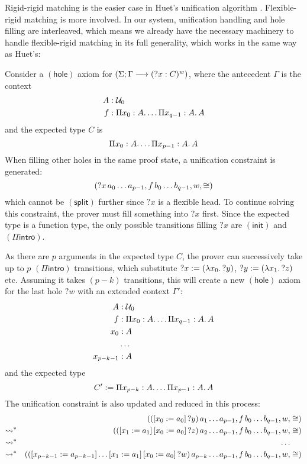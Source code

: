 \documentclass[twoside]{report}
\begin{document}
Rigid-rigid matching is the easier case in Huet's unification algorithm \cite{huet1975unification}. Flexible-rigid matching is more involved. In our system, unification handling and hole filling are interleaved, which means we already have the necessary machinery to handle flexible-rigid matching in its full generality, which works in the same way as Huet's:

\begin{example}
Consider a $(\mathsf{hole})$ axiom for $(\Sigma; \Gamma \longrightarrow ({?x} : C)^w)$, where the antecedent $\Gamma$ is the context
$$
\begin{aligned}
A &: \mathcal U_0 \\
f &: \Pi{x_0} : {A}.\,{\ldots \Pi{x_{q-1}} : {A}.\,{A}} \\
\end{aligned}
$$
and the expected type $C$ is
$$
\Pi{x_0} : {A}.\,{\ldots \Pi{x_{p-1}} : {A}.\,{A}}
$$
When filling other holes in the same proof state, a unification constraint is generated:
$$
({{{?x}\,{a_0}}\,{\ldots}}\,{a_{p-1}}, {{{f}\,{b_0}}\,{\ldots}}\,{b_{q-1}}, w, \cong)
$$
which cannot be $(\mathsf{split})$ further since ${?x}$ is a flexible head. To continue solving this constraint, the prover must fill something into ${?x}$ first. Since the expected type is a function type, the only possible transitions filling ${?x}$ are $(\mathsf{init})$ and $(\Pi\mathsf{intro})$.

As there are $p$ arguments in the expected type $C$, the prover can successively take up to $p$ $(\Pi\mathsf{intro})$ transitions, which substitute ${?x} := (\lambda{x_0}.\,{?y})$, ${?y} := (\lambda{x_1}.\,{?z})$ etc. Assuming it takes $(p - k)$ transitions, this will create a new $(\mathsf{hole})$ axiom for the last hole ${?w}$ with an extended context $\Gamma'$:
$$
\begin{aligned}
A &: \mathcal U_0 \\
f &: \Pi{x_0} : {A}.\,{\ldots \Pi{x_{q-1}} : {A}.\,{A}} \\
x_0 &: A \\
& \ldots \\
x_{p-k-1} &: A \\
\end{aligned}
$$
and the expected type
$$
C' := \Pi{x_{p-k}} : {A}.\,{\ldots \Pi{x_{p-1}} : {A}.\,{A}}
$$
The unification constraint is also updated and reduced in this process:
$$
\begin{aligned}
&& ({{{([{x_0}:={a_0}]\,{?}y)}\,{a_1}}\,{\ldots}}\,{a_{p-1}}, {{{f}\,{b_0}}\,{\ldots}}\,{b_{q-1}}, w, &\cong) \\
\rightsquigarrow^\ast && ({{{([{x_1}:={a_1}]\,{[{x_0}:={a_0}]\,{?}z})}\,{a_2}}\,{\ldots}}\,{a_{p-1}}, {{{f}\,{b_0}}\,{\ldots}}\,{b_{q-1}}, w, &\cong) \\
\rightsquigarrow^\ast && \ldots \\
\rightsquigarrow^\ast && ({{{([{x_{p-k-1}}:={a_{p-k-1}}]\,{\ldots [{x_1}:={a_1}]\,{[{x_0}:={a_0}]\,{?}w}})}\,{a_{p-k}}}\,{\ldots}}\,{a_{p-1}}, {{{f}\,{b_0}}\,{\ldots}}\,{b_{q-1}}, w, &\cong) \\
\end{aligned}
$$


\end{example}
\end{document}
